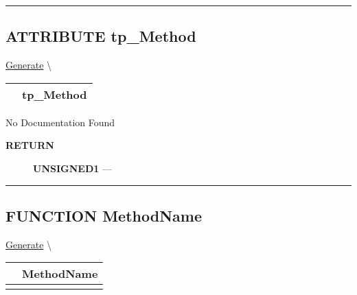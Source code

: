 \rule{\linewidth}{0.5pt}

\subsection*{\textsf{\colorbox{headtoc}{\color{white} ATTRIBUTE}
tp\_Method}}

\hypertarget{ecldoc:ecldoc-tp_Method}{}
\hspace{0pt} \hyperlink{ecldoc:ML_Core.Generate}{Generate} \textbackslash 

{\renewcommand{\arraystretch}{1.5}
\begin{tabularx}{\textwidth}{|>{\raggedright\arraybackslash}l|X|}
\hline
\hspace{0pt}\mytexttt{\color{red} } & \textbf{tp\_Method} \\
\hline
\end{tabularx}
}

\par





No Documentation Found








\par
\begin{description}
\item [\colorbox{tagtype}{\color{white} \textbf{\textsf{RETURN}}}] \textbf{UNSIGNED1} --- 
\end{description}




\rule{\linewidth}{0.5pt}
\subsection*{\textsf{\colorbox{headtoc}{\color{white} FUNCTION}
MethodName}}

\hypertarget{ecldoc:ml_core.generate.methodname}{}
\hspace{0pt} \hyperlink{ecldoc:ML_Core.Generate}{Generate} \textbackslash 

{\renewcommand{\arraystretch}{1.5}
\begin{tabularx}{\textwidth}{|>{\raggedright\arraybackslash}l|X|}
\hline
\hspace{0pt}\mytexttt{\color{red} } & \textbf{MethodName} \\
\hline
\multicolumn{2}{|>{\raggedright\arraybackslash}X|}{\hspace{0pt}\mytexttt{\color{param} (tp\_Method x)}} \\
\hline
\end{tabularx}
}

